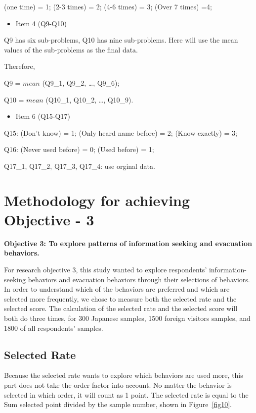 (one time) = 1; (2-3 times) = 2; (4-6 times) = 3; (Over 7 times) =4;

\begin{itemize}
\item Item 4 (Q9-Q10)
\end{itemize}

Q9 has six sub-problems, Q10 has nine sub-problems. Here will use the mean values of the sub-problems as the final data. 

Therefore, 

Q9 = $mean$ (Q9\_1, Q9\_2, \dots, Q9\_6);

Q10 = $mean$ (Q10\_1, Q10\_2, \dots, Q10\_9).

\begin{itemize}
\item Item 6 (Q15-Q17)
\end{itemize}

Q15: (Don't know) = 1; (Only heard name before) = 2; (Know exactly) = 3;

Q16: (Never used before) = 0; (Used before) = 1;
 
Q17\_1, Q17\_2, Q17\_3, Q17\_4: use orginal data.


\section{Methodology for achieving Objective - 3}

\textbf{Objective 3: To explore patterns of information seeking and evacuation behaviors.}

For research objective 3, this study wanted to explore respondents' information-seeking behaviors and evacuation behaviors through their selections of behaviors. In order to understand which of the behaviors are preferred and which are selected more frequently, we chose to measure both the selected rate and the selected score. The calculation of the selected rate and the selected score will both do three times, for 300 Japanese samples, 1500 foreign visitors samples, and 1800 of all respondents' samples.

\subsection{Selected Rate}
Because the selected rate wants to explore which behaviors are used more, this part does not take the order factor into account. No matter the behavior is selected in which order, it will count as 1 point. The selected rate is equal to the Sum selected point divided by the sample number, shown in Figure~\ref{fig10}.

